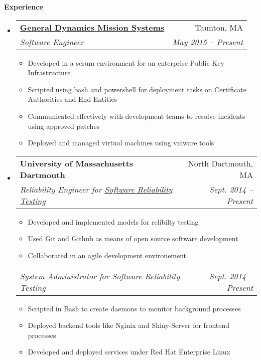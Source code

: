 \documentclass[letterpaper,11pt]{article}
\makeatletter
\newcommand{\resitem}[1]{\item #1 \vspace{-2pt}}
\newcommand{\resheading}[1]{{\large \colorbox{mygrey}{\begin{minipage}{\textwidth}{\textbf{#1 \vphantom{p\^{E}}}}\end{minipage}}}}
\newcommand{\ressubheading}[4]{
\begin{tabular*}{6.5in}{l@{\extracolsep{\fill}}r}
		\textbf{#1} & #2 \\
		\textit{#3} & \textit{#4} \\
\end{tabular*}\vspace{-6pt}}
\newcommand{\ressubsubheading}[2]{
\begin{tabular*}{6.5in}{l@{\extracolsep{\fill}}r}
		\textit{#1} & \textit{#2} \\
\end{tabular*}\vspace{-6pt}}
\makeatother
\begin{document}
\resheading{Experience}
	\begin{itemize}
		\item 
			\ressubheading{\href{https://www.gd-ais.com/}{General Dynamics Mission Systems}}{Taunton, MA}
				{Software Engineer}{May 2015 -- Present}
				{ \footnotesize
				\begin{itemize}
					\resitem{Developed in a scrum environment for an enterprise Public Key Infrastructure}
					\resitem{Scripted using bash and powershell for deployment tasks on Certificate Authorities and End Entities}
					\resitem{Communicated effectively with development teams to resolve incidents using approved patches}
                    \resitem{Deployed and managed virtual machines using vmware tools}

				\end{itemize}
				}
            \item{ 
            \ressubheading{{University of Massachusetts Dartmouth}}{North Dartmouth, MA}{Reliability Engineer for \href{http://github.com/lfiondella/SRT}{Software Reliability Testing}}{Sept. 2014 -- Present}
				{ \footnotesize
				\begin{itemize}
					\resitem{Developed and implemented models for relibilty testing}
					\resitem{Used Git and Github as means of open source software development}
					\resitem{Collaborated in an agile development environement}
				\end{itemize}
				}
             \ressubsubheading{System Administrator for Software Reliability Testing}{Sept. 2014 -- Present}
          { \footnotesize
				\begin{itemize}
					\resitem{Scripted in Bash to create daemons to monitor background processes}
					\resitem{Deployed backend tools like Nginix and Shiny-Server for frontend processes}
					\resitem{Developed and deployed services under Red Hat Enterprise Linux}
				\end{itemize}
    		}
        }
\begin{comment}
		\item
			\ressubheading{\href{http://www.byui.edu}{Brigham Young University - Idaho}}{Rexburg, ID}{Student Computer Lab Administrator - Lead Tech}{May 2008 -- Apr. 2009}
				{ \footnotesize
				\begin{itemize}
					\resitem{Trained, coordinated, and guided a small team of students towards the completion of tasks involving all computer labs on campus}
					\resitem{Administrated 62 labs, 1,300+ computers, and 17 PXE Servers in a two domain environment;  Utilized \href{http://www.symantec.com/business/deployment-solution}{Altiris Deployment Console} and scripting;  Specialized in \href{http://www.redhat.com/rhel/}{RHE Linux} deployments}

\end{comment}
\end{itemize}
\end{document}
